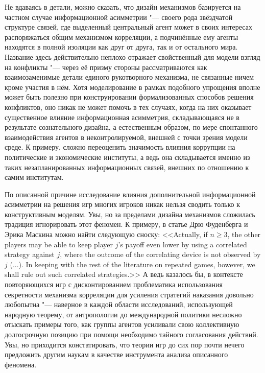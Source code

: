 Не вдаваясь в детали, можно сказать, что дизайн механизмов базируется на частном случае информационной асимметрии "--- своего рода звёздчатой структуре связей, где выделенный центральный агент может в своих интересах распоряжаться общим механизмом корреляции, а подчинённые ему агенты находятся в полной изоляции как друг от друга, так и от остального мира. Название здесь действительно неплохо отражает свойственный для модели взгляд на конфликты "--- через её призму стороны рассматриваются как взаимозаменимые детали единого рукотворного механизма, не связанные ничем кроме участия в нём. Хотя моделирование в рамках подобного упрощения вполне может быть полезно при конструировании формализованных способов решения конфликтов, оно никак не может помочь в тех случаях, когда на них оказывает существенное влияние информационная асимметрия, складывающаяся не в результате сознательного дизайна, а естественным образом, по мере спонтанного взаимодействия агентов в неконтролируемой, внешней с точки зрения модели среде. К примеру, сложно переоценить значимость влияния коррупции на политические и экономические институты, а ведь она складывается именно из таких незапланированных информационных связей, внешних по отношению к самим институтам.

По описанной причине исследование влияния дополнительной информационной асимметрии на решения игр многих игроков никак нельзя сводить только к конструктивным моделям. Увы, но за пределами дизайна механизмов сложилась традиция игнорировать этот феномен. К примеру, в статье \fixme{[3]} Дрю Фуденберга и Эрика Маскина можно найти следующую сноску: <<Actually, if $n \ge 3$, the other players may be able to keep player $j$'s payoff even lower by using a correlated strategy against $j$, where the outcome of the correlating device is not observed by $j$ (...). In keeping with the rest of the literature on repeated games, however, we shall rule out such correlated strategies.>> А ведь казалось бы, в контексте повторяющихся игр с дисконтированием проблематика использования секретности механизма корреляции для усиления стратегий наказания довольно любопытна "--- наверное в каждой области исследований, использующей народную теорему, от антропологии до международной политики несложно отыскать примеры того, как группы агентов усиливали свою коллективную долгосрочную позицию при помощи необходимо тайного согласования действий. Увы, но приходится констатировать, что теории игр до сих пор почти нечего предложить другим наукам в качестве инструмента анализа описанного феномена.

